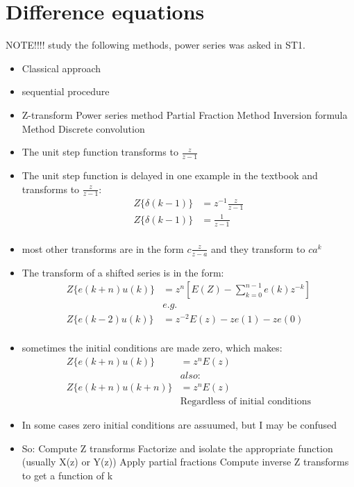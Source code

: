 \documentclass{report}
\begin{document}
\section{Difference equations} %
NOTE!!!! study the following methods, power series was asked in ST1.
\begin{itemize}
	\item Classical approach
	\item sequential procedure
	\item Z-transform
		\subitem Power series method
		\subitem Partial Fraction Method
		\subitem Inversion formula Method
		\subitem Discrete convolution
\end{itemize}
\label{sub:difference_equations}
\begin{itemize}
	\item The unit step function transforms to $\frac{z}{z-1} $
	\item The unit step function is delayed in one example in the textbook and transforms to $\frac{z}{z-1} $:
		\begin{align*}
			Z\{\delta(k-1) \} &= z^{-1}\frac{z}{z-1}\\
			Z\{\delta(k-1) \} &= \frac{1}{z-1}\\
		\end{align*}
	\item most other transforms are in the form $c\frac{z}{z-a}$ and they transform to $ca^k$ 
	\item The transform of a shifted series is in the form:
		\begin{align*}
			Z\{e(k+n)u(k)\} &= z^n\left[E(Z) - \sum_{k=0}^{n-1}e(k)z^{-k}\right]\\
			&e.g.\\
			Z\{e(k-2)u(k)\} &= z^{-2}E(z) - ze(1) - ze(0)\\
		\end{align*}
	\item sometimes the initial conditions are made zero, which makes:
		\begin{align*}
			Z\{e(k+n)u(k)\} &=z^nE(z)\\
			&also:\\
			Z\{e(k+n)u(k+n)\} &=z^nE(z)\\
			&\text{Regardless of initial conditions}
		\end{align*}
	\item In some cases zero initial conditions are assuumed, but I may be confused		
	\item So:
	\subitem Compute Z transforms 
	\subitem Factorize and isolate the appropriate function (usually X(z) or Y(z))
	\subitem Apply partial fractions 
	\subitem Compute inverse Z transforms to get a function of k
\end{itemize}
\end{document}
